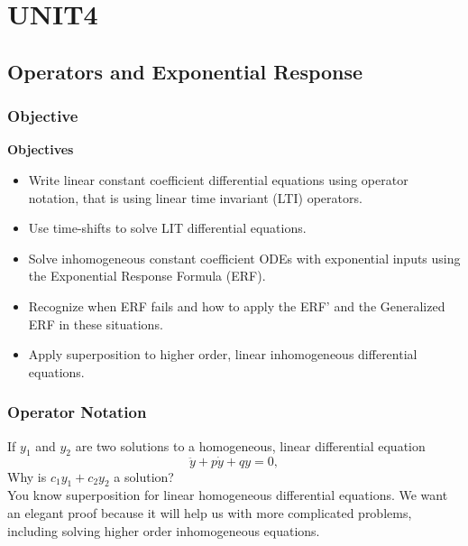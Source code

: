 \section{UNIT4}
\clearpage

\subsection{Operators and Exponential Response}

\subsubsection{Objective}

\textbf{\color{blue}Objectives}
\begin{itemize}
\item Write {\color{blue} linear constant coefficient} differential equations
  using {\color{blue} operator} notation, that is using
  {\color{blue} linear time invariant (LTI) operators}.
\item Use {\color{blue} time-shifts } to solve LIT differential equations.
\item Solve inhomogeneous constant coefficient ODEs with exponential inputs
  using the {\color{blue} Exponential Response Formula (ERF)}.
\item Recognize when ERF {\color{blue} fails} and how to apply the {\color{blue} ERF'} and
  the {\color{blue} Generalized ERF} in these situations.
\item Apply superposition to higher order, linear {\color{blue} inhomogeneous }
  differential equations. 
\end{itemize}
\clearpage

\subsubsection{Operator Notation}

If $y_1$ and $y_2$ are two solutions to a homogeneous, linear differential equation
\begin{equation*}
  \ddot y + p\dot y + qy = 0,
\end{equation*}
Why is $c_1y_1 + c_2y_2$ a solution?\\

You know superposition for linear homogeneous differential equations.
We want an elegant proof because it will help us with more complicated problems,
including solving higher order inhomogeneous equations.\\

